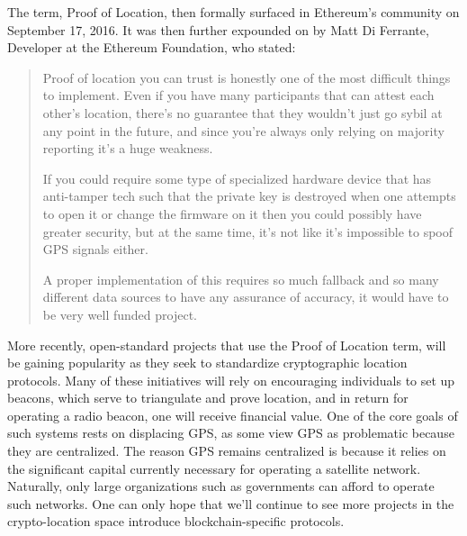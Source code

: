 \documentclass{article}
\begin{document}
The term, Proof of Location, then formally surfaced in Ethereum's community on September 17, 2016. It was then further expounded on by Matt Di Ferrante, Developer at the Ethereum Foundation, who stated:

\begin{quotation}
Proof of location you can trust is honestly one of the most difficult things to implement. Even if you have many participants that can attest each other's location, there's no guarantee that they wouldn't just go sybil at any point in the future, and since you're always only relying on majority reporting it's a huge weakness.

If you could require some type of specialized hardware device that has anti-tamper tech such that the private key is destroyed when one attempts to open it or change the firmware on it then you could possibly have greater security, but at the same time, it's not like it's impossible to spoof GPS signals either.

A proper implementation of this requires so much fallback and so many different data sources to have any assurance of accuracy, it would have to be very well funded project.
\end{quotation}

More recently, open-standard projects that use the Proof of Location term, will be gaining popularity as they seek to standardize cryptographic location protocols. Many of these initiatives will rely on encouraging individuals to set up beacons, which serve to triangulate and prove location, and in return for operating a radio beacon, one will receive financial value. One of the core goals of such systems rests on displacing GPS, as some view GPS as problematic because they are centralized. The reason GPS remains centralized is because it relies on the significant capital currently necessary for operating a satellite network. Naturally, only large organizations such as governments can afford to operate such networks. One can only hope that we'll continue to see more projects in the crypto-location space introduce blockchain-specific protocols.
\end{document}
